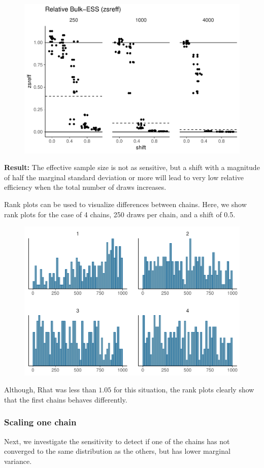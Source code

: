 \documentclass[american,]{article}
\begin{document}
\begin{figure}[tp]
  \centering
  \includegraphics[width=0.6\linewidth]{graphics/zsreff-shifted-chain-1.pdf}
\end{figure}

\textbf{Result:} The effective sample size is not as sensitive, but a
shift with a magnitude of half the marginal standard deviation or more
will lead to very low relative efficiency when the total number of draws
increases.

Rank plots can be used to visualize differences between chains. Here, we
show rank plots for the case of 4 chains, 250 draws per chain, and a
shift of 0.5.

\begin{figure}[tp]
  \centering
  \includegraphics[width=0.6\linewidth]{graphics/hist-shifted-chain-1.pdf}
\end{figure}

Although, Rhat was less than \(1.05\) for this situation, the rank plots
clearly show that the first chains behaves differently.

\hypertarget{scaling-one-chain}{%
\subsubsection*{Scaling one chain}\label{scaling-one-chain}}

Next, we investigate the sensitivity to detect if one of the chains has
not converged to the same distribution as the others, but has lower
marginal variance.
\end{document}

